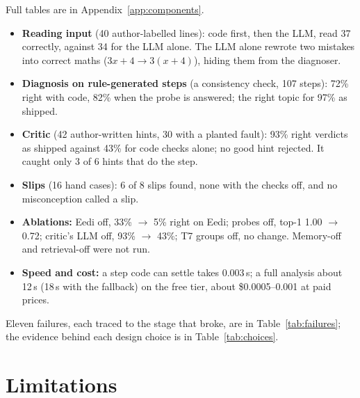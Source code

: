 \documentclass[11pt,a4paper]{article}
\begin{document}
Full tables are in Appendix~\ref{app:components}.
\begin{itemize}
  \item \textbf{Reading input} (40 author-labelled lines): code first, then the LLM, read 37 correctly, against 34 for the LLM alone. The LLM alone rewrote two mistakes into correct maths ($3x + 4 \to 3(x + 4)$), hiding them from the diagnoser.
  \item \textbf{Diagnosis on rule-generated steps} (a consistency check, 107 steps): 72\% right with code, 82\% when the probe is answered; the right topic for 97\% as shipped.
  \item \textbf{Critic} (42 author-written hints, 30 with a planted fault): 93\% right verdicts as shipped against 43\% for code checks alone; no good hint rejected. It caught only 3 of 6 hints that do the step.
  \item \textbf{Slips} (16 hand cases): 6 of 8 slips found, none with the checks off, and no misconception called a slip.
  \item \textbf{Ablations:} Eedi off, 33\% $\to$ 5\% right on Eedi; probes off, top-1 1.00 $\to$ 0.72; critic's LLM off, 93\% $\to$ 43\%; T7 groups off, no change. Memory-off and retrieval-off were not run.
  \item \textbf{Speed and cost:} a step code can settle takes 0.003\,s; a full analysis about 12\,s (18\,s with the fallback) on the free tier, about \$0.0005--0.001 at paid prices.
\end{itemize}
Eleven failures, each traced to the stage that broke, are in Table~\ref{tab:failures}; the evidence behind each design choice is in Table~\ref{tab:choices}.


\section{Limitations}\label{sec:limits}
\end{document}
